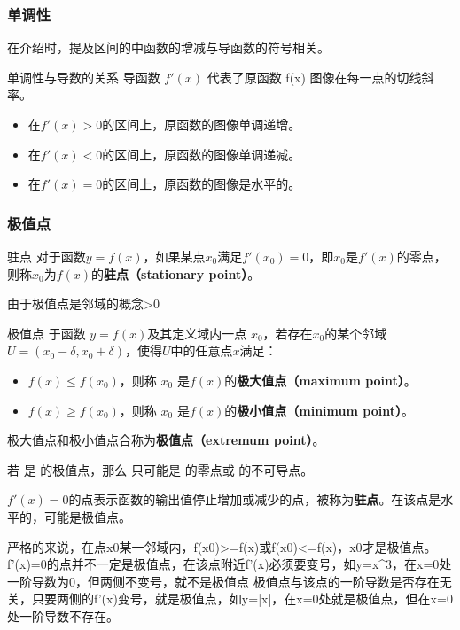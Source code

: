 \subsubsection{单调性}
在介绍时，提及区间的中函数的增减与导函数的符号相关。
\begin{theorem}{单调性与导数的关系}
导函数  $f'(x)$  代表了原函数  f(x)  图像在每一点的切线斜率。
\begin{itemize}
\item 在$f'(x)>0$的区间上，原函数的图像单调递增。
\item 在$f'(x)<0$的区间上，原函数的图像单调递减。
\item 在$f'(x)=0$的区间上，原函数的图像是水平的。
\end{itemize}
\end{theorem}


\subsubsection{极值点}

\begin{definition}{驻点}
对于函数$y=f(x)$，如果某点$x_0$满足$f'(x_0)=0$，即$x_0$是$f'(x)$的零点，则称$x_0$为$f(x)$的\textbf{驻点（stationary point）}。
\end{definition}

由于极值点是邻域的概念\delta>0


\begin{definition}{极值点}
于函数 $y=f(x)$及其定义域内一点 $x_0$，若存在$x_0$的某个邻域$U=\left( x_0-\delta,x_0+\delta \right)$，使得$U$中的任意点$x$满足：
\begin{itemize}
\item $f(x) \leq f\left(x_0\right)$，则称 $x_0$ 是$f(x)$的\textbf{极大值点（maximum point）}。
\item $f(x) \geq f\left(x_0\right)$，则称 $x_0$ 是$f(x)$的\textbf{极小值点（minimum point）}。
\end{itemize}
极大值点和极小值点合称为\textbf{极值点（extremum point）}。
\end{definition}

若  是 的极值点，那么  只可能是  的零点或 的不可导点。


$f'(x) = 0$的点表示函数的输出值停止增加或减少的点，被称为\textbf{驻点}。在该点是水平的，可能是极值点。

严格的来说，在点x0某一邻域内，f(x0)>=f(x)或f(x0)<=f(x)，x0才是极值点。
f’(x)=0的点并不一定是极值点，在该点附近f’(x)必须要变号，如y=x^3，在x=0处一阶导数为0，但两侧不变号，就不是极值点
极值点与该点的一阶导数是否存在无关，只要两侧的f’(x)变号，就是极值点，如y=|x|，在x=0处就是极值点，但在x=0处一阶导数不存在。


